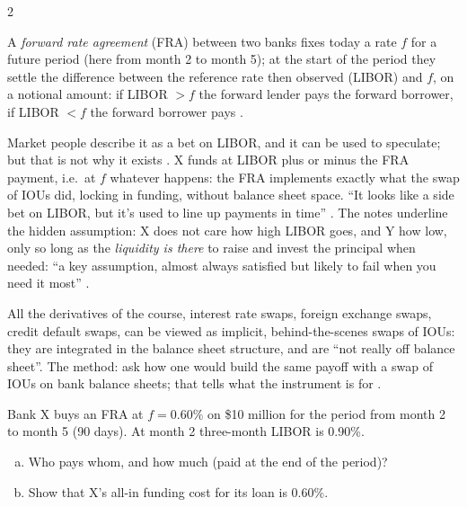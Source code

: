 \begin{paracol}{2}
\begin{definition}\label{def:ed-fra}
A \emph{forward rate agreement} (FRA) between two banks fixes today a rate $f$ for a future period (here from month 2 to month 5); at the start of the period they settle the
difference between the reference rate then observed (LIBOR) and $f$, on a notional amount: if LIBOR $>f$ the forward lender pays the forward borrower, if LIBOR $<f$ the
forward borrower pays .
\end{definition}

Market people describe it as a bet on LIBOR, and it can be used to speculate; but that is not why it exists . X funds at LIBOR plus or minus the FRA payment,
i.e.\ at $f$ whatever happens: the FRA implements exactly what the swap of IOUs did, locking in funding, without balance sheet space. ``It looks like a side bet on LIBOR, but it's used to
line up payments in time'' . The notes underline the hidden assumption: X does not care how high LIBOR goes, and Y how low, only so long as the
\emph{liquidity is there} to raise and invest the principal when needed: ``a key assumption, almost always satisfied but likely to fail when you need it most''
.

\begin{proposition}
All the derivatives of the course, interest rate swaps, foreign exchange swaps, credit default swaps, can be viewed as implicit, behind-the-scenes swaps of IOUs: they are integrated in
the balance sheet structure, and are ``not really off balance sheet''. The method: ask how one would build the same payoff with a swap of IOUs on bank balance sheets; that tells what
the instrument is for .
\end{proposition}

\begin{exercise}
Bank X buys an FRA at $f=0.60\%$ on \$10 million for the period from month 2 to month 5 (90 days). At month 2 three-month LIBOR is 0.90\%.
\begin{enumerate}[(a)]
  \item Who pays whom, and how much (paid at the end of the period)?
  \item Show that X's all-in funding cost for its loan is 0.60\%.
\end{enumerate}
\end{exercise}


\end{paracol}
